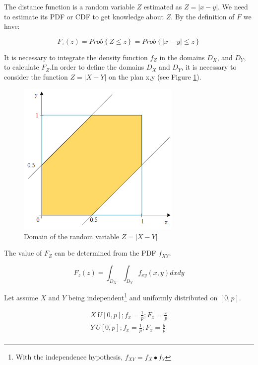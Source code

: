 The distance function is a random variable $Z$ estimated as $Z=|x-y|$. We need to estimate its PDF or CDF to get knowledge about $Z$. By the definition of $F$ we have:

\begin{equation}
F_z\left(z\right)=Prob{\left\{Z\le z\right\}}=Prob\left\{\left|x-y\right|\le z\right\}
\label{eq_Distance1}
\end{equation}

It is necessary to integrate the density function $f_Z$ in the domains $D_X$, and $D_Y$, to calculate $F_Z$.In order to define the domains $D_X$ and $D_Y$, it is necessary to consider the function $Z=\left|X-Y\right|$ on the plan x,y (see Figure \ref{fig_DistanceDomain}).

\begin{figure}[hbt!]
\centering
\includegraphics[width=0.7\textwidth]{SectionLetsMath/elemStat_figures/fig_DistanceDomain.png}
\captionsetup{type=figure}
\caption{Domain of the random variable $Z=|X-Y|$}
\label{fig_DistanceDomain}
\end{figure}

The value of $F_Z$ can be determined from the PDF $f_{XY}$.

\begin{equation}
F_z\left(z\right)=\int_{D_X}\int_{D_Y}{f_{xy}\left(x,y\right)dxdy}
\label{eq_Distance2}
\end{equation}

Let assume $X$ and $Y$ being independent\footnote{With the independence hypothesis, $f_{XY}=f_X\bullet f_Y$} and uniformly distributed on $[0,p]$. 

\begin{equation}
    \label{eq_Distance3}
    \begin{split}
    X~U\left[0,p\right];f_x=\frac{1}{p};F_x=\frac{x}{p} \\
    Y~U\left[0,p\right];f_x=\frac{1}{p};F_x=\frac{y}{p} \\
    \end{split}
\end{equation}

